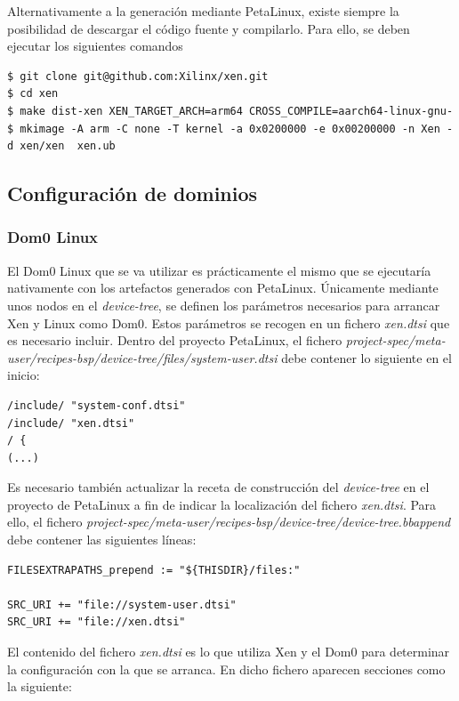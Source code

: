 Alternativamente a la generación mediante PetaLinux, existe siempre la posibilidad de descargar el código fuente y compilarlo. Para ello, se deben ejecutar los siguientes comandos \cite{xen_source_xilinx}

\begin{lstlisting}[style=CStyle]
$ git clone git@github.com:Xilinx/xen.git
$ cd xen
$ make dist-xen XEN_TARGET_ARCH=arm64 CROSS_COMPILE=aarch64-linux-gnu-
$ mkimage -A arm -C none -T kernel -a 0x0200000 -e 0x00200000 -n Xen -d xen/xen  xen.ub
\end{lstlisting}

\subsection{Configuración de dominios}
\subsubsection{Dom0 Linux}

El Dom0 Linux que se va utilizar es prácticamente el mismo que se ejecutaría nativamente con los artefactos generados con PetaLinux. Únicamente mediante unos nodos en el \textit{device-tree}, se definen los parámetros necesarios para arrancar Xen y Linux como Dom0. Estos parámetros se recogen en un fichero \textit{xen.dtsi} que es necesario incluir. Dentro del proyecto PetaLinux, el fichero \textit{project-spec/meta-user/recipes-bsp/device-tree/files/system-user.dtsi} debe contener lo siguiente en el inicio:

\begin{lstlisting}[style=CStyle]
/include/ "system-conf.dtsi"
/include/ "xen.dtsi"
/ {
(...)
\end{lstlisting}

Es necesario también actualizar la receta de construcción del \textit{device-tree} en el proyecto de PetaLinux a fin de indicar la localización del fichero \textit{xen.dtsi}. Para ello, el fichero \textit{project-spec/meta-user/recipes-bsp/device-tree/device-tree.bbappend} debe contener las siguientes líneas:

\begin{lstlisting}[style=CStyle]
FILESEXTRAPATHS_prepend := "${THISDIR}/files:"

SRC_URI += "file://system-user.dtsi"
SRC_URI += "file://xen.dtsi"
\end{lstlisting}

El contenido del fichero \textit{xen.dtsi} es lo que utiliza Xen y el Dom0 para determinar la configuración con la que se arranca. En dicho fichero aparecen secciones como la siguiente:

